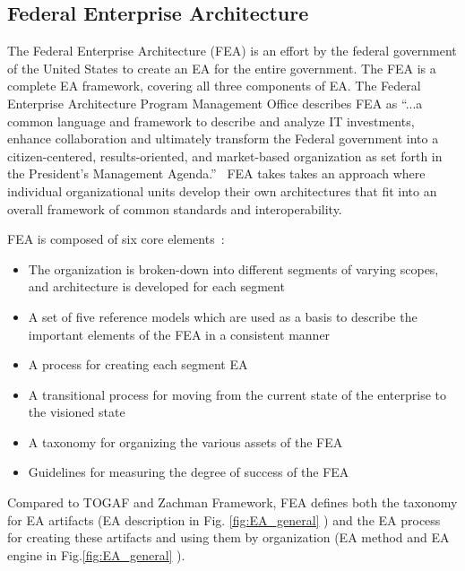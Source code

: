 
\subsection{Federal Enterprise Architecture}
The Federal Enterprise Architecture (FEA) is an effort by the federal government of the United States to create an EA for the entire government. The FEA is a complete EA framework, covering all three components of EA. The Federal Enterprise Architecture Program Management Office describes FEA as ``...a common language and framework to describe and analyze IT investments, enhance collaboration and ultimately transform the Federal government into a citizen-centered, results-oriented, and market-based organization as set forth in the President's Management Agenda.''~\cite{FEA_PMO2007} FEA takes takes an approach where individual organizational units develop their own architectures that fit into an overall framework of common standards and interoperability.

FEA is composed of six core elements~\cite{sessions2007}:
\begin{itemize}
    \item The organization is broken-down into different segments of varying scopes, and architecture is developed for each segment
    \item A set of five reference models which are used as a basis to describe the important elements of the FEA in a consistent manner
    \item A process for creating each segment EA
    \item A transitional process for moving from the current state of the enterprise to the visioned state
    \item A taxonomy for organizing the various assets of the FEA
    \item Guidelines for measuring the degree of success of the FEA
\end{itemize}
Compared to TOGAF and Zachman Framework, FEA defines both the taxonomy for EA artifacts (EA description in Fig. \ref{fig:EA_general} ) and the EA process for creating these artifacts and using them by organization (EA method and EA engine in Fig.\ref{fig:EA_general} ). 

